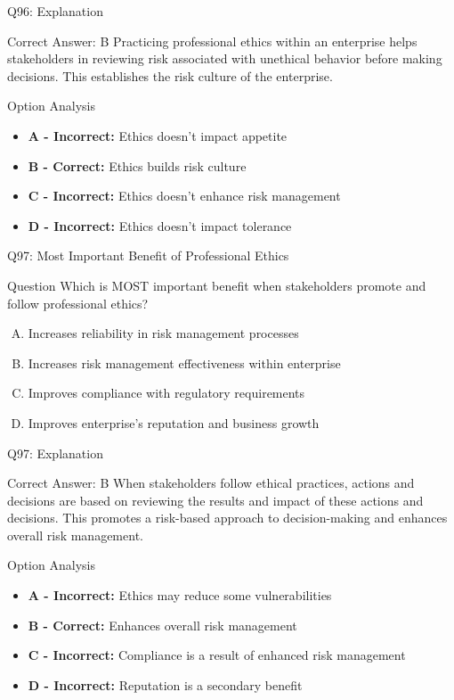\documentclass{beamer}
\begin{document}
	\begin{frame}{Q96: Explanation}
		\begin{block}{Correct Answer: B}
			Practicing professional ethics within an enterprise helps stakeholders in reviewing risk associated with unethical behavior before making decisions. This establishes the risk culture of the enterprise.
		\end{block}
		\begin{block}{Option Analysis}
			\begin{itemize}
				\item \textbf{A - Incorrect:} Ethics doesn't impact appetite
				\item \textbf{B - Correct:} Ethics builds risk culture
				\item \textbf{C - Incorrect:} Ethics doesn't enhance risk management
				\item \textbf{D - Incorrect:} Ethics doesn't impact tolerance
			\end{itemize}
		\end{block}
	\end{frame}
	
	\begin{frame}{Q97: Most Important Benefit of Professional Ethics}
		\begin{block}{Question}
			Which is MOST important benefit when stakeholders promote and follow professional ethics?
		\end{block}
		\begin{enumerate}[(A)]
			\item Increases reliability in risk management processes
			\item Increases risk management effectiveness within enterprise
			\item Improves compliance with regulatory requirements
			\item Improves enterprise's reputation and business growth
		\end{enumerate}
	\end{frame}
	
	\begin{frame}{Q97: Explanation}
		\begin{block}{Correct Answer: B}
			When stakeholders follow ethical practices, actions and decisions are based on reviewing the results and impact of these actions and decisions. This promotes a risk-based approach to decision-making and enhances overall risk management.
		\end{block}
		\begin{block}{Option Analysis}
			\begin{itemize}
				\item \textbf{A - Incorrect:} Ethics may reduce some vulnerabilities
				\item \textbf{B - Correct:} Enhances overall risk management
				\item \textbf{C - Incorrect:} Compliance is a result of enhanced risk management
				\item \textbf{D - Incorrect:} Reputation is a secondary benefit
			\end{itemize}
		\end{block}
	\end{frame}
	
\end{document}
